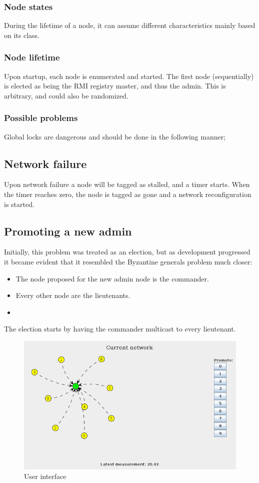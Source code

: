 \documentclass[10pt,a4paper]{article}
\begin{document}
\subsubsection{Node states}
During the lifetime of a node, it can assume different characteristics mainly based on its class.

\subsubsection{Node lifetime}
Upon startup, each node is enumerated and started. The first node (sequentially) is elected as being the RMI registry master, and thus the admin. This is arbitrary, and could also be randomized.

\subsubsection{Possible problems}
Global locks are dangerous and should be done in the following manner; 

\subsection{Network failure}

Upon network failure a node will be tagged as stalled, and a timer starts. When the timer reaches zero, the node is tagged as gone and a network reconfiguration is started.

\subsection{Promoting a new admin}
Initially, this problem was treated as an election, but as development progressed it became evident that it resembled the Byzantine generals problem much closer:
\begin{itemize}
\item The node proposed for the new admin node is the commander.
\item Every other node are the lieutenants.
\item 
\end{itemize}

The election starts by having the commander multicast %
to every lieutenant.

\begin{figure}[h]
\centering
\includegraphics[scale=0.4]{fig/UI.png}
 \caption{User interface}
 \label{fig:ui}
\end{figure}
\end{document}
